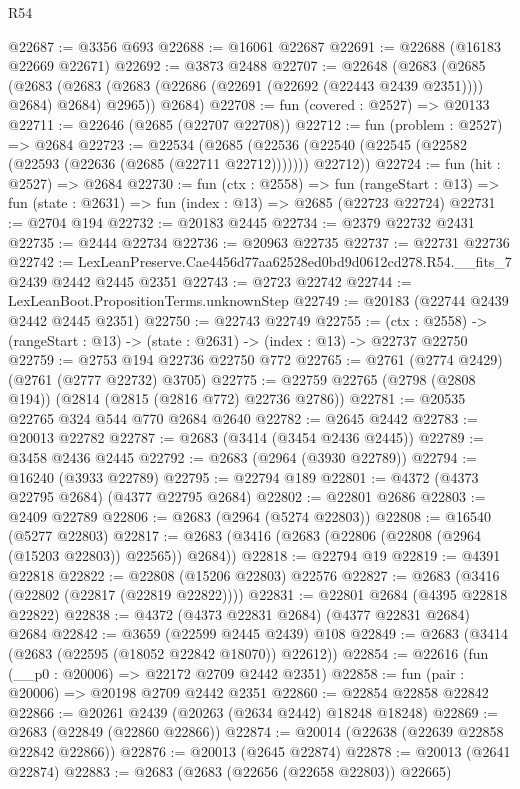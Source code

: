 \begin{lexlean}{R54}
\begin{coremodule}
@22687 := @3356 @693
@22688 := @16061 @22687
@22691 := @22688 (@16183 @22669 @22671)
@22692 := @3873 @2488
@22707 := @22648
    (@2683
      (@2685
        (@2683 (@2683 (@2683 (@22686 (@22691 (@22692 (@22443 @2439 @2351)))) @2684) @2684) @2965))
      @2684)
@22708 := fun (covered : @2527) => @20133
@22711 := @22646 (@2685 (@22707 @22708))
@22712 := fun (problem : @2527) => @2684
@22723 := @22534
    (@2685 (@22536 (@22540 (@22545 (@22582 (@22593 (@22636 (@2685 (@22711 @22712))))))) @22712))
@22724 := fun (hit : @2527) => @2684
@22730 := fun (ctx : @2558) =>
  fun (rangeStart : @13) => fun (state : @2631) => fun (index : @13) => @2685 (@22723 @22724)
@22731 := @2704 @194
@22732 := @20183 @2445
@22734 := @2379 @22732 @2431
@22735 := @2444 @22734
@22736 := @20963 @22735
@22737 := @22731 @22736
@22742 := LexLeanPreserve.Cae4456d77aa62528ed0bd9d0612cd278.R54.__fits_7 @2439 @2442 @2445 @2351
@22743 := @2723 @22742
@22744 := LexLeanBoot.PropositionTerms.unknownStep
@22749 := @20183 (@22744 @2439 @2442 @2445 @2351)
@22750 := @22743 @22749
@22755 := (ctx : @2558) -> (rangeStart : @13) -> (state : @2631) -> (index : @13) -> @22737 @22750
@22759 := @2753 @194 @22736 @22750 @772
@22765 := @2761 (@2774 @2429) (@2761 (@2777 @22732) @3705)
@22775 := @22759 @22765 (@2798 (@2808 @194)) (@2814 (@2815 (@2816 @772) @22736 @2786))
@22781 := @20535 @22765 @324 @544 @770 @2684 @2640
@22782 := @2645 @2442
@22783 := @20013 @22782
@22787 := @2683 (@3414 (@3454 @2436 @2445))
@22789 := @3458 @2436 @2445
@22792 := @2683 (@2964 (@3930 @22789))
@22794 := @16240 (@3933 @22789)
@22795 := @22794 @189
@22801 := @4372 (@4373 @22795 @2684) (@4377 @22795 @2684)
@22802 := @22801 @2686
@22803 := @2409 @22789
@22806 := @2683 (@2964 (@5274 @22803))
@22808 := @16540 (@5277 @22803)
@22817 := @2683 (@3416 (@2683 (@22806 (@22808 (@2964 (@15203 @22803)) @22565)) @2684))
@22818 := @22794 @19
@22819 := @4391 @22818
@22822 := @22808 (@15206 @22803) @22576
@22827 := @2683 (@3416 (@22802 (@22817 (@22819 @22822))))
@22831 := @22801 @2684 (@4395 @22818 @22822)
@22838 := @4372 (@4373 @22831 @2684) (@4377 @22831 @2684) @2684
@22842 := @3659 (@22599 @2445 @2439) @108
@22849 := @2683 (@3414 (@2683 (@22595 (@18052 @22842 @18070)) @22612))
@22854 := @22616 (fun (__p0 : @20006) => @22172 @2709 @2442 @2351)
@22858 := fun (pair : @20006) => @20198 @2709 @2442 @2351
@22860 := @22854 @22858 @22842
@22866 := @20261 @2439 (@20263 (@2634 @2442) @18248 @18248)
@22869 := @2683 (@22849 (@22860 @22866))
@22874 := @20014 (@22638 (@22639 @22858 @22842 @22866))
@22876 := @20013 (@2645 @22874)
@22878 := @20013 (@2641 @22874)
@22883 := @2683 (@2683 (@22656 (@22658 @22803)) @22665)

\end{coremodule}
\end{lexlean}
